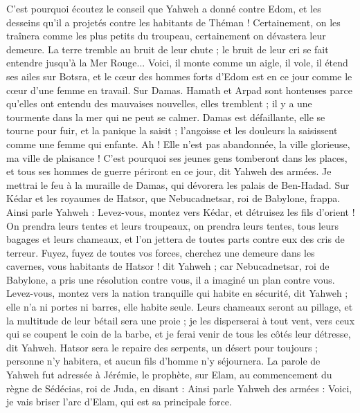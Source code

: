 \begin{multicols}{2}
C'est pourquoi écoutez le conseil que Yahweh a donné contre Edom, et les desseins qu'il a projetés contre les habitants de Théman ! Certainement, on les traînera comme les plus petits du troupeau, certainement on dévastera leur demeure.
La terre tremble au bruit de leur chute ; le bruit de leur cri se fait entendre jusqu'à la Mer Rouge...
Voici, il monte comme un aigle, il vole, il étend ses ailes sur Botsra, et le cœur des hommes forts d'Edom est en ce jour comme le cœur d'une femme en travail.
Sur Damas. Hamath et Arpad sont honteuses parce qu'elles ont entendu des mauvaises nouvelles, elles tremblent ; il y a une tourmente dans la mer qui ne peut se calmer.
Damas est défaillante, elle se tourne pour fuir, et la panique la saisit ; l'angoisse et les douleurs la saisissent comme une femme qui enfante.
Ah ! Elle n'est pas abandonnée, la ville glorieuse, ma ville de plaisance !
C'est pourquoi ses jeunes gens tomberont dans les places, et tous ses hommes de guerre périront en ce jour, dit Yahweh des armées.
Je mettrai le feu à la muraille de Damas, qui dévorera les palais de Ben-Hadad.
Sur Kédar et les royaumes de Hatsor, que Nebucadnetsar, roi de Babylone, frappa. Ainsi parle Yahweh : Levez-vous, montez vers Kédar, et détruisez les fils d'orient !
On prendra leurs tentes et leurs troupeaux, on prendra leurs tentes, tous leurs bagages et leurs chameaux, et l'on jettera de toutes parts contre eux des cris de terreur.
Fuyez, fuyez de toutes vos forces, cherchez une demeure dans les cavernes, vous habitants de Hatsor ! dit Yahweh ; car Nebucadnetsar, roi de Babylone, a pris une résolution contre vous, il a imaginé un plan contre vous.
Levez-vous, montez vers la nation tranquille qui habite en sécurité, dit Yahweh ; elle n'a ni portes ni barres, elle habite seule.
Leurs chameaux seront au pillage, et la multitude de leur bétail sera une proie ; je les disperserai à tout vent, vers ceux qui se coupent le coin de la barbe, et je ferai venir de tous les côtés leur détresse, dit Yahweh.
Hatsor sera le repaire des serpents, un désert pour toujours ; personne n’y habitera, et aucun fils d'homme n'y séjournera.
La parole de Yahweh fut adressée à Jérémie, le prophète, sur Elam, au commencement du règne de Sédécias, roi de Juda, en disant :
Ainsi parle Yahweh des armées : Voici, je vais briser l'arc d'Elam, qui est sa principale force.

\end{multicols}
